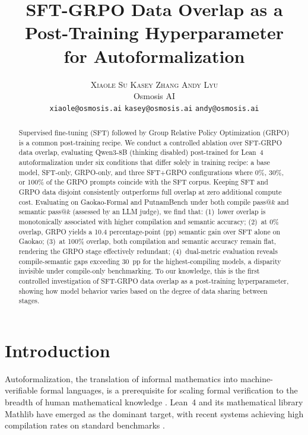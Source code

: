 \documentclass[11pt,a4paper]{article}
\title{SFT-GRPO Data Overlap as a Post-Training Hyperparameter\\for Autoformalization}
\author{
  \textsc{Xiaole Su} \quad \textsc{Kasey Zhang} \quad \textsc{Andy Lyu} \\[4pt]
  Osmosis AI \\[2pt]
  {\small \texttt{xiaole@osmosis.ai} \quad \texttt{kasey@osmosis.ai} \quad \texttt{andy@osmosis.ai}}
}
\date{}
\begin{document}
\maketitle

\begin{abstract}
Supervised fine-tuning (SFT) followed by Group Relative Policy Optimization (GRPO) is a common post-training recipe. We conduct a controlled ablation over SFT-GRPO data overlap, evaluating Qwen3-8B (thinking disabled) post-trained for Lean~4 autoformalization under six conditions that differ solely in training recipe: a base model, SFT-only, GRPO-only, and three SFT+GRPO configurations where 0\%, 30\%, or 100\% of the GRPO prompts coincide with the SFT corpus. Keeping SFT and GRPO data disjoint consistently outperforms full overlap at zero additional compute cost. Evaluating on Gaokao-Formal and PutnamBench under both compile pass@$k$ and semantic pass@$k$ (assessed by an LLM judge), we find that: (1)~lower overlap is monotonically associated with higher compilation and semantic accuracy; (2)~at 0\% overlap, GRPO yields a 10.4 percentage-point (pp) semantic gain over SFT alone on Gaokao; (3)~at 100\% overlap, both compilation and semantic accuracy remain flat, rendering the GRPO stage effectively redundant; (4)~dual-metric evaluation reveals compile-semantic gaps exceeding 30~pp for the highest-compiling models, a disparity invisible under compile-only benchmarking. To our knowledge, this is the first controlled investigation of SFT-GRPO data overlap as a post-training hyperparameter, showing how model behavior varies based on the degree of data sharing between stages.
\end{abstract}

\section{Introduction}\label{sec:intro}

Autoformalization, the translation of informal mathematics into machine-verifiable formal languages, is a prerequisite for scaling formal verification to the breadth of human mathematical knowledge \citep{wu2022autoformalization}. Lean~4 \citep{demoura2021lean4} and its mathematical library Mathlib have emerged as the dominant target, with recent systems achieving high compilation rates on standard benchmarks \citep{wang2025kimina, zhang2025mathesis, wu2025stepfun}.
\end{document}
